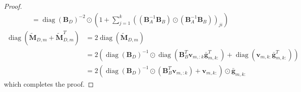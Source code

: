 \documentclass[a4paper, 11pt, oneside]{scrartcl}
\theoremstyle{break}
\DeclareMathOperator{\diag}{diag}
\newcommand{\matr}[1]{\boldsymbol{#1}}
\numberwithin{equation}{section}
\begin{document}
\begin{proof}
\begin{align*}
							&= \diag(\matr{B}_D)^{-2} \odot \left(1 + \sum_{j=1}^k ((\matr{B}_A^{-1} \matr{B}_B) \odot (\matr{B}_A^{-1} \matr{B}_B))_{ji} \right)
						\end{align*}
						\begin{align*}
							\diag(\matr{\tilde{M}}_{D, m} + \matr{\tilde{M}}_{D, m}^T) &= 2 \diag(\matr{\tilde{M}}_{D, m}) \\
							&= 2 (\diag(\matr{B}_D)^{-1} \odot \diag(\matr{B}_B^T \matr{v}_{m, :k} \matr{\bar{g}}_{m, k:}^T) + \diag(\matr{v}_{m, k:} \matr{\bar{g}}_{m, k:}^T)) \\
							&= 2 (\diag(\matr{B}_D)^{-1} \odot (\matr{B}_B^T \matr{v}_{m, :k}) + \matr{v}_{m, k:}) \odot \matr{\bar{g}}_{m, k:}
						\end{align*}
						which completes the proof.
					\end{proof}
\end{document}
